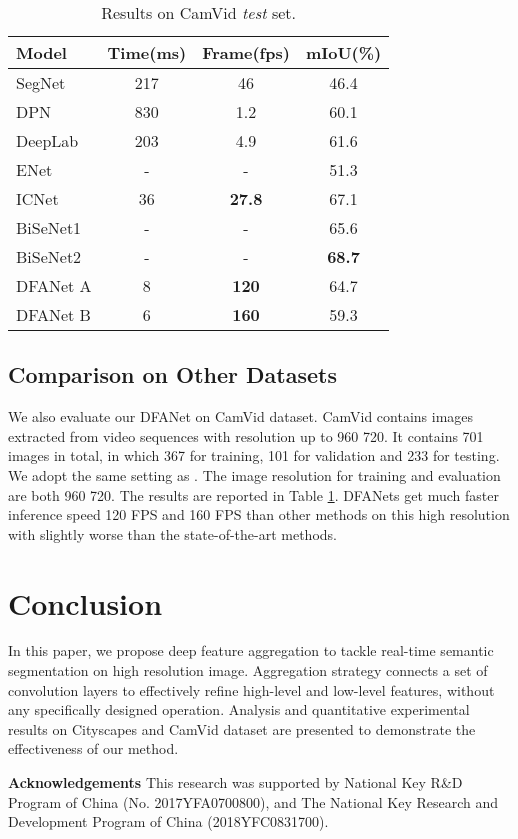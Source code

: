 \documentclass[10pt,twocolumn,letterpaper]{article}
\begin{document}
\begin{table}
\begin{center}
\begin{tabular}{|l|c|c|c|}
\hline
Model & Time(ms) & Frame(fps) & mIoU(\%) \\
\hline\hline
SegNet\cite{segnet}    & 217 & 46   & 46.4 \\
DPN\cite{dfn}          & 830 & 1.2  & 60.1 \\
DeepLab\cite{DeepLab2} & 203 & 4.9  & 61.6 \\
ENet\cite{enet}        & -   & -    & 51.3 \\
ICNet\cite{ICNet}      & 36  & \textbf{27.8} & 67.1 \\
BiSeNet1\cite{BiSeNet} & -   & -    & 65.6 \\
BiSeNet2\cite{BiSeNet} & -   & -    & \textbf{68.7} \\
\hline
DFANet A               & 8  & \textbf{120}  & 64.7 \\
DFANet B               & 6  & \textbf{160}  & 59.3 \\
\hline
\end{tabular}
\end{center}
\caption{Results on CamVid \textit{test} set. }
\label{tab:CamVid Results}
\end{table}

\subsection{Comparison on Other Datasets}
We also evaluate our DFANet on CamVid dataset. 
CamVid contains images extracted from video sequences with resolution up to 960  720. 
It contains 701 images in total, in which 367 for training, 101 for validation and 233 for testing. We adopt the same setting as \cite{CamVid_set}.
The image resolution for training and evaluation are both 960  720. The results are reported in Table \ref{tab:CamVid Results}. DFANets get much faster inference speed 120 FPS and 160 FPS than other methods on this high resolution with slightly worse than the state-of-the-art methods\cite{ICNet}.


\section{Conclusion}
In this paper, we propose deep feature aggregation to tackle real-time semantic segmentation on high resolution image. Aggregation strategy connects a set of convolution layers to effectively refine high-level and low-level features, without any specifically designed operation. Analysis and quantitative experimental results on Cityscapes and CamVid dataset are presented to demonstrate the effectiveness of our method.

\textbf{Acknowledgements} This research was supported by National Key R\&D Program of China (No. 2017YFA0700800), and The National Key Research and Development Program of China (2018YFC0831700). 


{\small


}
\end{document}
